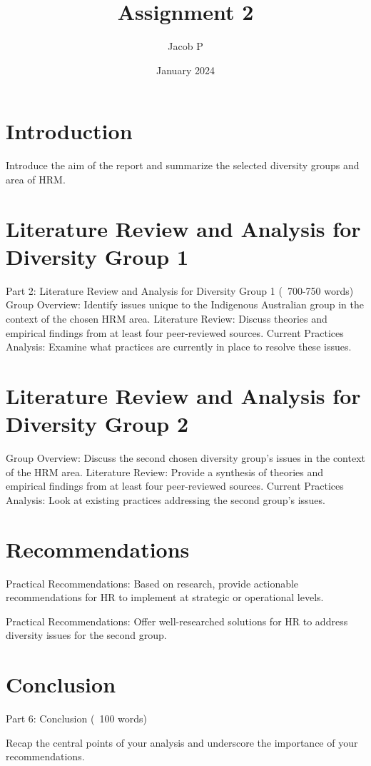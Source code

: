 \documentclass{article}
\title{Assignment 2}
\author{Jacob P }
\date{January 2024}
\begin{document}
\maketitle

\section{Introduction}
Introduce the aim of the report and summarize the selected diversity groups and area of HRM.

\section{Literature Review and Analysis for Diversity Group 1}
Part 2: Literature Review and Analysis for Diversity Group 1 (~700-750 words) 
Group Overview: Identify issues unique to the Indigenous Australian group in the context of the chosen HRM area.
Literature Review: Discuss theories and empirical findings from at least four peer-reviewed sources.
Current Practices Analysis: Examine what practices are currently in place to resolve these issues.

\section{Literature Review and Analysis for Diversity Group 2}

Group Overview: Discuss the second chosen diversity group's issues in the context of the HRM area.
Literature Review: Provide a synthesis of theories and empirical findings from at least four peer-reviewed sources.
Current Practices Analysis: Look at existing practices addressing the second group’s issues.
\section{Recommendations}

Practical Recommendations: Based on research, provide actionable recommendations for HR to implement at strategic or operational levels.

Practical Recommendations: Offer well-researched solutions for HR to address diversity issues for the second group.

\section{Conclusion}
Part 6: Conclusion (~100 words)

Recap the central points of your analysis and underscore the importance of your recommendations.
\end{document}
